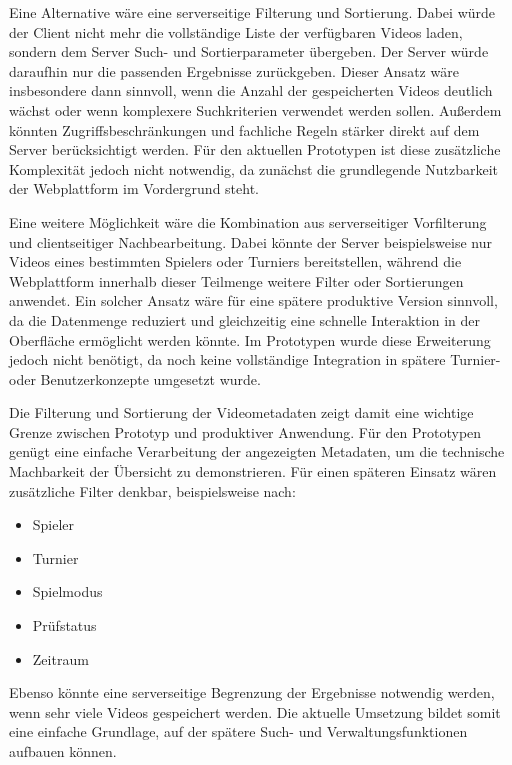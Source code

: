 Eine Alternative wäre eine serverseitige Filterung und Sortierung. Dabei würde der Client nicht mehr die vollständige Liste der verfügbaren Videos laden, sondern dem Server Such- und Sortierparameter übergeben. Der Server würde daraufhin nur die passenden Ergebnisse zurückgeben. 
Dieser Ansatz wäre insbesondere dann sinnvoll, wenn die Anzahl der gespeicherten Videos deutlich wächst oder wenn komplexere Suchkriterien verwendet werden sollen. Außerdem könnten Zugriffsbeschränkungen und fachliche Regeln stärker direkt auf dem Server berücksichtigt werden. 
Für den aktuellen Prototypen ist diese zusätzliche Komplexität jedoch nicht notwendig, da zunächst die grundlegende Nutzbarkeit der Webplattform im Vordergrund steht. 

Eine weitere Möglichkeit wäre die Kombination aus serverseitiger Vorfilterung und clientseitiger Nachbearbeitung. Dabei könnte der Server beispielsweise nur Videos eines bestimmten Spielers oder Turniers bereitstellen,
 während die Webplattform innerhalb dieser Teilmenge weitere Filter oder Sortierungen anwendet. Ein solcher Ansatz wäre für eine spätere produktive Version sinnvoll, da die Datenmenge reduziert und gleichzeitig eine schnelle Interaktion in der Oberfläche ermöglicht werden könnte. 
 Im Prototypen wurde diese Erweiterung jedoch nicht benötigt, da noch keine vollständige Integration in spätere Turnier- oder Benutzerkonzepte umgesetzt wurde. 

Die Filterung und Sortierung der Videometadaten zeigt damit eine wichtige Grenze zwischen Prototyp und produktiver Anwendung. Für den Prototypen genügt eine einfache Verarbeitung der angezeigten Metadaten, um die technische Machbarkeit der Übersicht zu demonstrieren. 
Für einen späteren Einsatz wären zusätzliche Filter denkbar, beispielsweise nach:

\begin{itemize} 
    \item Spieler 
    \item Turnier 
    \item Spielmodus 
    \item Prüfstatus
    \item Zeitraum
\end{itemize} 

Ebenso könnte eine serverseitige Begrenzung der Ergebnisse notwendig werden, wenn sehr viele Videos gespeichert werden. Die aktuelle Umsetzung bildet somit eine einfache Grundlage, auf der spätere Such- und Verwaltungsfunktionen aufbauen können.

